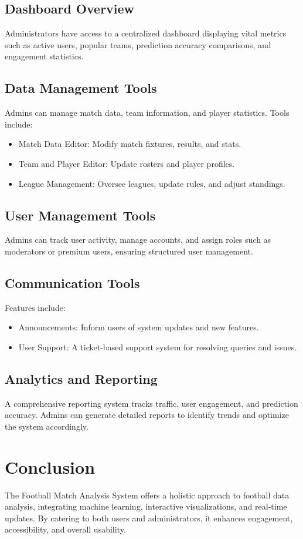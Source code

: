\subsection{Dashboard Overview}
Administrators have access to a centralized dashboard displaying vital metrics such as active users, popular teams, prediction accuracy comparisons, and engagement statistics.

\subsection{Data Management Tools}
Admins can manage match data, team information, and player statistics. Tools include:
\begin{itemize}
    \item Match Data Editor: Modify match fixtures, results, and stats.
    \item Team and Player Editor: Update rosters and player profiles.
    \item League Management: Oversee leagues, update rules, and adjust standings.
\end{itemize}

\subsection{User Management Tools}
Admins can track user activity, manage accounts, and assign roles such as moderators or premium users, ensuring structured user management.

\subsection{Communication Tools}
Features include:
\begin{itemize}
    \item Announcements: Inform users of system updates and new features.
    \item User Support: A ticket-based support system for resolving queries and issues.
\end{itemize}

\subsection{Analytics and Reporting}
A comprehensive reporting system tracks traffic, user engagement, and prediction accuracy. Admins can generate detailed reports to identify trends and optimize the system accordingly.

\section{Conclusion}
The Football Match Analysis System offers a holistic approach to football data analysis, integrating machine learning, interactive visualizations, and real-time updates. By catering to both users and administrators, it enhances engagement, accessibility, and overall usability.
